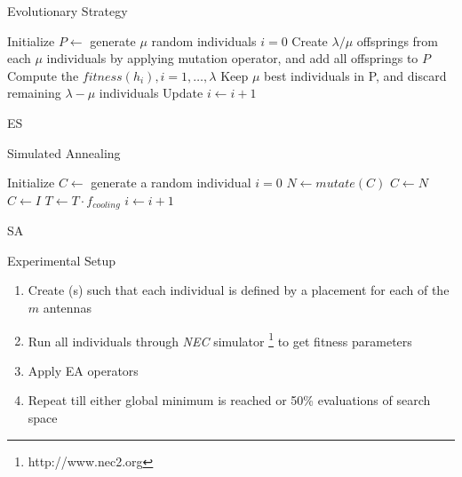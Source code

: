 \documentclass{beamer}
\begin{document}
\begin{frame}{Evolutionary Strategy}
    \fontsize{8}{12}\selectfont
    \begin{algorithm}[H]
        Initialize $P\leftarrow$ generate $\mu$ random individuals\;
        $i=0$ \;
         {
            Create $\lambda / \mu$ offsprings from  each $\mu$ individuals by applying mutation operator, and add all offsprings to $P$ \;
            Compute the $fitness(h_i), i=1,\ldots, \lambda$ \;
            Keep $\mu$ best individuals in P, and discard remaining $\lambda - \mu$ individuals \;
            Update $i \leftarrow i+1$
        }
        \caption{ES}
    \end{algorithm}
\end{frame}

\begin{frame}{Simulated Annealing}
    \fontsize{8}{8}\selectfont
    \begin{algorithm}[H]
        Initialize $C\leftarrow$ generate a random individual \;
        $i=0$ \;
         {
            $N \leftarrow mutate(C)$ \; 
             {
                 {
                    $C \leftarrow N$
                }}  {
                $C \leftarrow I$ \; }
                $T \leftarrow T \cdot f_{cooling}$ \;
                $i \leftarrow i + 1$ \;
            } 
            \caption{SA}
            \label{alg:ap-sa}
        \end{algorithm}
    \end{frame}


    \begin{frame}[t]{Experimental Setup}
        \begin{enumerate}
            \item Create (s) such that each individual is defined by a placement for each of the $m$ antennas
            \item Run all individuals through \textit{NEC} simulator \footnote{http://www.nec2.org} to get fitness parameters 
            \item Apply EA operators 
            \item Repeat till either global minimum is reached or 50\% evaluations of search space 
        \end{enumerate}
        \vspace{10mm}
    \end{frame}
\end{document}
